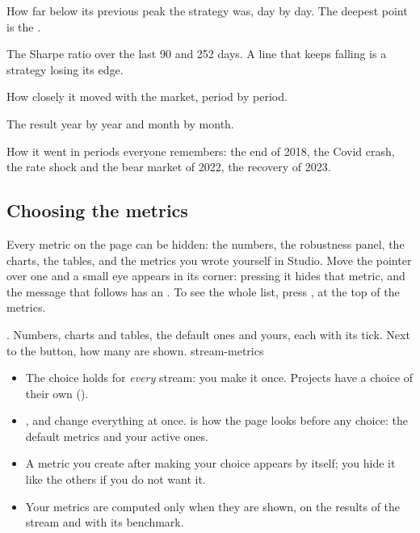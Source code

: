 \begin{description}[leftmargin = 1.4em, style = nextline, itemsep = 4pt]
  \item[\voce{Drawdown (Underwater)}] How far below its previous peak the
    strategy was, day by day. The deepest point is the .
  \item[\voce{Rolling Sharpe Ratio}] The Sharpe ratio over the last 90 and
    252 days. A line that keeps falling is a strategy losing its edge.
  \item[\voce{Rolling Correlation vs SPY}] How closely it moved with the
    market, period by period.
  \item[\voce{Yearly Returns}, \voce{Monthly Returns Heatmap}] The result
    year by year and month by month.
  \item[\voce{Stress Test Periods}] How it went in periods everyone
    remembers: the end of 2018, the Covid crash, the rate shock and the bear
    market of 2022, the recovery of 2023.
\end{description}

\subsection{Choosing the metrics}\label{sez:stream-metrics}

Every metric on the page can be hidden: the numbers, the robustness panel,
the charts, the tables, and the metrics you wrote yourself in Studio. Move
the pointer over one and a small eye appears in its corner: pressing it
hides that metric, and the message that follows has an .
To see the whole list, press , at the top of
the metrics.

  {. Numbers, charts and tables, the default
   ones and yours, each with its tick. Next to the button, how many are
   shown.}
  {stream-metrics}

\begin{itemize}
  \item The choice holds for \emph{every} stream: you make it once. Projects
    have a choice of their own ().
  \item {},  and
     change everything at once.  is how
    the page looks before any choice: the default metrics and your active
    ones.
  \item A metric you create after making your choice appears by itself; you
    hide it like the others if you do not want it.
  \item Your metrics are computed only when they are shown, on the results
    of the stream and with its benchmark.
\end{itemize}

